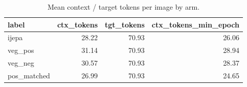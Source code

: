 \begin{table}[t]
\centering
\small
\caption{Mean context / target tokens per image by arm.}
\label{tab:token_budget}
\begin{tabular}{lrrr}
\toprule
label & ctx\_tokens & tgt\_tokens & ctx\_tokens\_min\_epoch \\
\midrule
ijepa & 28.22 & 70.93 & 26.06 \\
veg\_pos & 31.14 & 70.93 & 28.94 \\
veg\_neg & 30.57 & 70.93 & 28.37 \\
pos\_matched & 26.99 & 70.93 & 24.65 \\
\bottomrule
\end{tabular}
\end{table}
